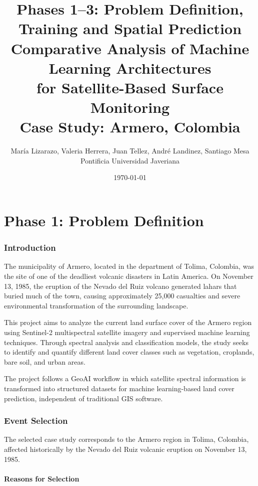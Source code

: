 \documentclass[12pt,a4paper]{article}
\title{
\textbf{Phases 1--3: Problem Definition, Training and Spatial Prediction} \\
Comparative Analysis of Machine Learning Architectures \\
for Satellite-Based Surface Monitoring \\
\vspace{0.5cm}
Case Study: Armero, Colombia
}
\author{
Mar\'ia Lizarazo, Valeria Herrera, Juan Tellez, Andr\'e Landinez, Santiago Mesa \\
Pontificia Universidad Javeriana
}
\date{\today}
\begin{document}
\maketitle
\newpage
\tableofcontents
\newpage

\part{Phase 1: Problem Definition}

\section{Introduction}

The municipality of Armero, located in the department of Tolima, Colombia, was the site of one of the deadliest volcanic disasters in Latin America. On November 13, 1985, the eruption of the Nevado del Ruiz volcano generated lahars that buried much of the town, causing approximately 25,000 casualties and severe environmental transformation of the surrounding landscape.

This project aims to analyze the current land surface cover of the Armero region using Sentinel-2 multispectral satellite imagery and supervised machine learning techniques. Through spectral analysis and classification models, the study seeks to identify and quantify different land cover classes such as vegetation, croplands, bare soil, and urban areas.

The project follows a GeoAI workflow in which satellite spectral information is transformed into structured datasets for machine learning-based land cover prediction, independent of traditional GIS software.

\section{Event Selection}

The selected case study corresponds to the Armero region in Tolima, Colombia, affected historically by the Nevado del Ruiz volcanic eruption on November 13, 1985.

\subsection{Reasons for Selection}
\end{document}
